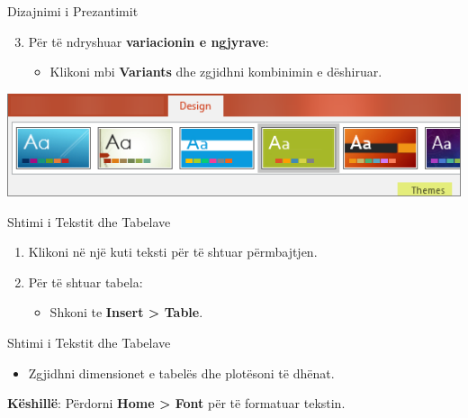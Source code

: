 \documentclass[
  ignorenonframetext,
]{beamer}
\providecommand{\tightlist}{%
  \setlength{\itemsep}{0pt}\setlength{\parskip}{0pt}}
\begin{document}
\begin{frame}{Dizajnimi i Prezantimit}
\label{dizajnimi-i-prezantimit-1}
\begin{enumerate}
\setcounter{enumi}{2}
\item
  Për të ndryshuar \textbf{variacionin e ngjyrave}:

  \begin{itemize}
  \tightlist
  \item
    Klikoni mbi \textbf{Variants} dhe zgjidhni kombinimin e dëshiruar.
  \end{itemize}
\end{enumerate}

\includegraphics{./images/powerpoint3.png}
\end{frame}

\begin{frame}{Shtimi i Tekstit dhe Tabelave}
\label{shtimi-i-tekstit-dhe-tabelave}
\begin{enumerate}
\item
  Klikoni në një kuti teksti për të shtuar përmbajtjen.
\item
  Për të shtuar tabela:

  \begin{itemize}
  \tightlist
  \item
    Shkoni te \textbf{Insert \textgreater{} Table}.
  \end{itemize}
\end{enumerate}
\end{frame}

\begin{frame}{Shtimi i Tekstit dhe Tabelave}
\label{shtimi-i-tekstit-dhe-tabelave-1}
\begin{itemize}
\tightlist
\item
  Zgjidhni dimensionet e tabelës dhe plotësoni të dhënat.
\end{itemize}

\textbf{Këshillë}: Përdorni \textbf{Home \textgreater{} Font} për të
formatuar tekstin.
\end{frame}
\end{document}
